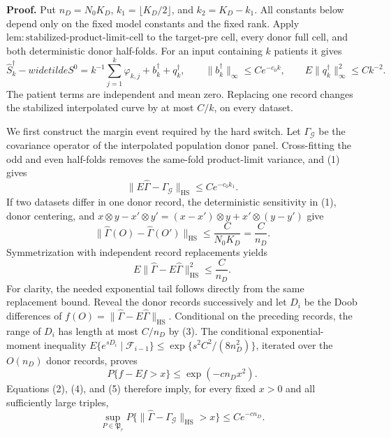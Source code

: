 \textbf{Proof.}
Put \(n_D=N_0K_D\), \(k_1=\lfloor K_D/2\rfloor\), and
\(k_2=K_D-k_1\).  All constants below depend only on the fixed model
constants and the fixed rank.  Apply
\(\mathrm{lem:stabilized\mbox{-}product\mbox{-}limit\mbox{-}cell}\) to the
target-pre cell, every donor full cell, and both deterministic donor
half-folds.  For an input containing \(k\) patients it gives
\[
 \widehat S_k^\dagger-widetilde S^0
 =k^{-1}\sum_{j=1}^k\varphi_{k,j}+b_k^\dagger+q_k^\dagger,
 \qquad
 \|b_k^\dagger\|_\infty\le Ce^{-c_0k},
 \qquad
 E\|q_k^\dagger\|_\infty^2\le Ck^{-2}.                 \tag{1}
\]
The patient terms are independent and mean zero.  Replacing one record
changes the stabilized interpolated curve by at most \(C/k\), on every
dataset.

We first construct the margin event required by the hard switch.  Let
\(\Gamma_{\mathcal G}\) be the covariance operator of the interpolated
population donor panel.  Cross-fitting the odd and even half-folds removes
the same-fold product-limit variance, and (1) gives
\[
 \|E\widehat\Gamma-\Gamma_{\mathcal G}\|_{\mathrm{HS}}
 \le Ce^{-c_0k_1}.                                      \tag{2}
\]
If two datasets differ in one donor record, the deterministic sensitivity in
(1), donor centering, and
\(x\otimes y-x'\otimes y'=(x-x')\otimes y+x'\otimes(y-y')\)
give
\[
 \|\widehat\Gamma(O)-\widehat\Gamma(O')\|_{\mathrm{HS}}
 \le \frac{C}{N_0K_D}=\frac C{n_D}.                    \tag{3}
\]
Symmetrization with independent record replacements yields
\[
 E\|\widehat\Gamma-E\widehat\Gamma\|_{\mathrm{HS}}^2
 \le \frac C{n_D}.                                     \tag{4}
\]
For clarity, the needed exponential tail follows directly from the same
replacement bound.  Reveal the donor records successively and let
\(D_i\) be the Doob differences of
\(f(O)=\|\widehat\Gamma-E\widehat\Gamma\|_{\mathrm{HS}}\).
Conditional on the preceding records, the range of \(D_i\) has length at
most \(C/n_D\) by (3).  The conditional exponential-moment inequality
\(E\{e^{sD_i}\mid\mathcal F_{i-1}\}\le
\exp\{s^2C^2/(8n_D^2)\}\), iterated over the \(O(n_D)\)
donor records, proves
\[
 P\{f-Ef>x\}\le \exp(-cn_Dx^2).                        \tag{5}
\]
Equations (2), (4), and (5) therefore imply, for every fixed \(x>0\) and
all sufficiently large triples,
\[
 \sup_{P\in\mathfrak P_r}
 P\{\|\widehat\Gamma-\Gamma_{\mathcal G}\|_{\mathrm{HS}}>x\}
 \le Ce^{-cn_D}.                                        \tag{6}
\]

